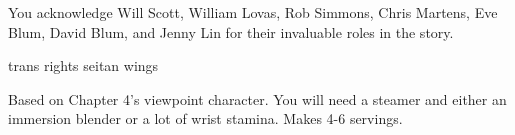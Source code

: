 \documentclass[12pt]{article}
\begin{document}
\vspace{24em}

\noindent You acknowledge Will Scott, William Lovas, Rob Simmons, Chris Martens, Eve Blum, David Blum, and Jenny Lin for their invaluable roles in the story.

\newpage \thispagestyle{empty}

\begin{center}
	{\sc \Large trans rights seitan wings}
\end{center}

Based on Chapter 4's viewpoint character.
You will need a steamer and either an immersion blender or a lot of wrist stamina.
Makes 4-6 servings.

\vspace{1em}
\end{document}
